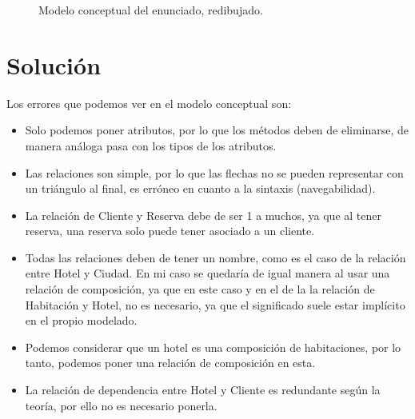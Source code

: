\begin{figure}[H]
    \caption{Modelo conceptual del enunciado, redibujado.}
    \label{fig:pdf}
\end{figure}

\newpage
\section{Solución}


Los errores que podemos ver en el modelo conceptual son:
\begin{itemize}
    \item Solo podemos poner atributos, por lo que los métodos deben de eliminarse, de manera análoga pasa con los tipos de los atributos.
    \item Las relaciones son simple, por lo que las flechas no se pueden representar con un triángulo al final, es erróneo en cuanto a la sintaxis (navegabilidad).
    \item La relación de Cliente y Reserva debe de ser 1  a muchos, ya que al tener reserva, una reserva solo puede tener asociado a un cliente.
    \item Todas las relaciones deben de tener un nombre, como es el caso de la relación entre Hotel y Ciudad.  En mi caso se quedaría de igual manera al usar una relación de composición, ya que en este caso y en el de la la relación de Habitación y Hotel, no es necesario, ya que el significado suele estar implícito en el propio modelado. 
    \item Podemos considerar que un hotel es una composición de habitaciones, por lo tanto, podemos poner una relación de composición en esta.
    \item La relación de dependencia entre Hotel y Cliente es redundante según la teoría, por ello no es necesario ponerla.
\end{itemize}
\newpage

